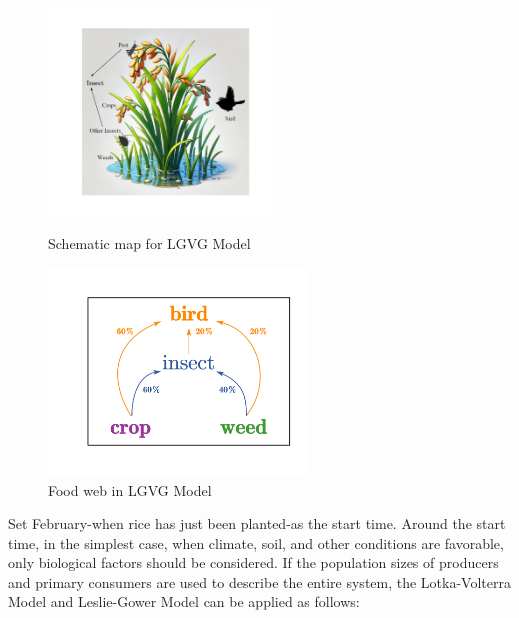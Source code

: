\documentclass{HZNUMCM}
\begin{document}
      \begin{figure}[H]
        \centering
          \begin{minipage}[b]{0.45\linewidth}
              \centering
              \includegraphics[height=5.5cm, keepaspectratio]{images/LGVGField.pdf} %
              \caption{Schematic map for LGVG Model}
              \label{fig:LGVGField}
          \end{minipage}
        \hspace{0.05\linewidth}
          \begin{minipage}[b]{0.45\linewidth}
              \centering
              \includegraphics[height=5.5cm, keepaspectratio]{images/SimpleFoodWeb.pdf}
              \caption{Food web in LGVG Model}
              \label{fig:SimpleFoodWeb}
          \end{minipage}
        \end{figure}
      Set February-when rice has just been planted-as the start time.
      Around the start time, in the simplest case, when climate, soil, and other conditions are favorable, 
      only biological factors should be considered.
      If the population sizes of producers and primary consumers are used to describe the entire system, 
      the Lotka-Volterra Model\cite{wangersky1978lotka} and Leslie-Gower Model\cite{GUO20142850} can be applied as follows:
\end{document}

